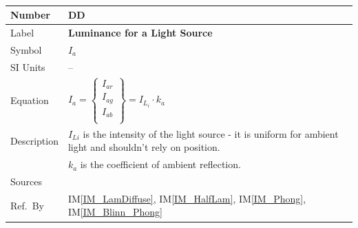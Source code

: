 \documentclass[12pt]{article}
\newcommand{\colAwidth}{0.13\textwidth}
\newcommand{\colBwidth}{0.82\textwidth}
\newcounter{defnum} %
\newcounter{datadefnum} %
\newcommand{\iref}[1]{IM\ref{#1}}
\begin{document}
~\newline

\noindent
\begin{minipage}{\textwidth}
	\renewcommand*{\arraystretch}{1.5}
	\begin{tabular}{| p{\colAwidth} | p{\colBwidth}|}
		\hline
		\rowcolor[gray]{0.9}
		Number& DD{datadefnum}\thedatadefnum 
		\label{DD_Intensity_ambient}\\
		\hline
		Label& \bf Luminance for a Light Source\\
		\hline
		Symbol &$I_{a}$\\
		\hline
		SI Units & --\\
		\hline
		Equation&$I_{a} = \begin{Bmatrix}
		I_{ar} \\ I_{ag} \\ I_{ab} \\
		\end{Bmatrix} = I_{L_{i}}\cdot k_{a}$\\
		\hline
		Description & $I_{L{i}}$ is the intensity of the light source - it is 
		uniform for ambient light and shouldn't rely on position. \\
		& $k_{a}$ is the coefficient of ambient reflection.\\
		\hline
		Sources& \cite{shreiner2012}\\
		\hline
		Ref.\ By & \iref{IM_LamDiffuse}, \iref{IM_HalfLam}, \iref{IM_Phong}, 
		\iref{IM_Blinn_Phong}\\
		\hline
	\end{tabular}
\end{minipage}\\


~\newline
\end{document}
